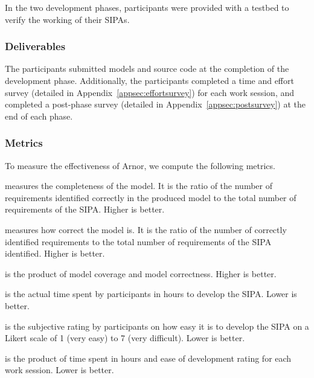 \documentclass[11pt,          %
               phd,           %
               onehalfspacing %
               ]{ncsuthesis}
\newcommand{\frameworkA}{Arnor\xspace}
\begin{document}
In the two development phases, participants were provided with a testbed
to verify the working of their SIPAs.

\subsubsection*{Deliverables}

The participants submitted models and source code at the completion of
the development phase. Additionally, the participants completed a time
and effort survey (detailed in Appendix~\ref{appsec:effortsurvey}) for
each work session, and completed a post-phase survey (detailed in
Appendix~\ref{appsec:postsurvey}) at the end of each phase.

\subsubsection*{Metrics}

To measure the effectiveness of \frameworkA, we compute the following metrics.

\begin{description}[leftmargin=1em]
\item[Model coverage] measures the completeness of the model. It is the
ratio of the number of requirements identified correctly in the produced
model to the total number of requirements of the SIPA. Higher is better.

\item[Model correctness] measures how correct the model is.  It is the
ratio of the number of correctly identified requirements to the total
number of requirements of the SIPA identified.  Higher is better.

\item[Model quality] is the product of model coverage and model
correctness. Higher is better.

\item[Time to develop] is the actual time spent by participants in hours
to develop the SIPA.  Lower is better.

\item[Difficulty of development] is the subjective rating by
participants on how easy it is to develop the SIPA on a Likert scale of
1 (very easy) to 7 (very difficult). Lower is better.

\item[Effort to develop] is the product of time spent in hours and ease
of development rating for each work session. Lower is better.
\end{description}
\end{document}
